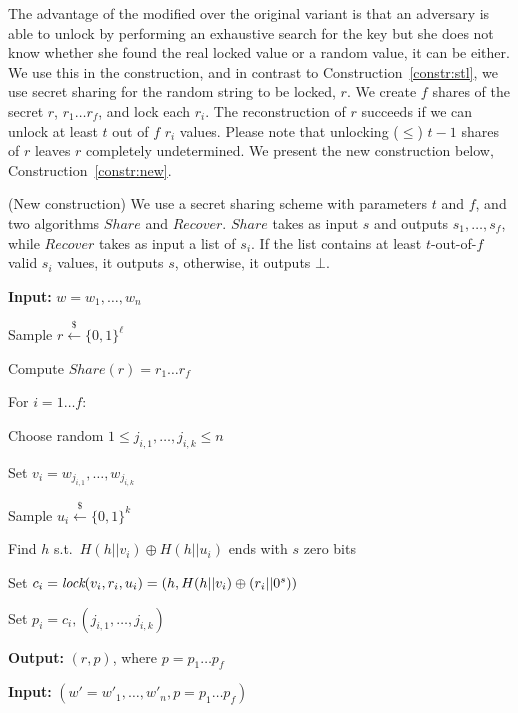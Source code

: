 The advantage of the modified \dl over the original variant is that an adversary is able to unlock by performing an exhaustive search for the key but she does not know whether she found the real locked value or a random value, it can be either. We use this in the \fe construction, and in contrast to Construction~\ref{constr:stl}, we use secret sharing for the random string to be locked, $r$. We create $f$ shares of the secret $r$, $r_1 \dots r_f$, and lock each $r_i$. The reconstruction of $r$ succeeds if we can unlock at least $t$ out of $f$ $r_i$ values. Please note that unlocking ($\leq$) $t-1$ shares of $r$ leaves $r$ completely undetermined. We present the new construction below, Construction~\ref{constr:new}.


\begin{construction}{(New construction)}\label{constr:new} We use a secret sharing scheme with parameters $t$ and $f$, and two algorithms $Share$ and $Recover$. $Share$ takes as input $s$ and outputs $s_1, \dots, s_f$, while $Recover$ takes as input a list of $s_i$. If the list contains at least $t$-out-of-$f$ valid $s_i$ values, it outputs $s$, otherwise, it outputs $\bot$.

\footnotesize	

\begin{multicols}{2}
\gen

\textbf{Input:} $w = w_1,\dots,w_n$

Sample $r \xleftarrow{\$} \{0,1\}^\ell$

Compute $Share(r) = r_1 \dots r_f $  

For $i = 1 \dots f$:

        \quad Choose random $1 \leq j_{i,1},\dots, j_{i,k} \leq n$ 
        
        \quad Set $v_{i} = w_{j_{i,1}},\dots, w_{j_{i,k}}$ 
        
        \quad Sample $u_{i} \xleftarrow{\$} \{0,1\}^k$
        
        \quad Find $h$ s.t.\ $H(h||v_{i}) \oplus H(h||u_{i})$ ends with $s$ zero bits
        
        \quad Set $c_{i} = \textit{lock}(v_{i}, r_i, u_{i}) = ( h, H(h||v_{i}) \oplus (r_i||0^s))$
        
        \quad Set $p_{i} = c_{i}, (j_{i,1},\dots, j_{i,k})$

\textbf{Output:} $(r,p)$, where $p = p_1 \dots p_f$

\columnbreak
\rep

\textbf{Input:} $(w' = w'_1,\dots,w'_n, p = p_1 \dots p_f)$


\end{multicols}
\end{construction}
